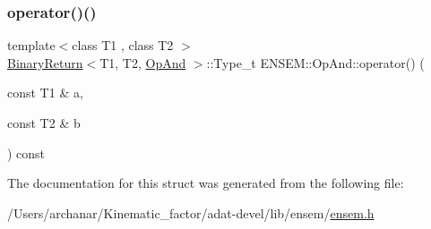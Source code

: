 \subsubsection{\texorpdfstring{operator()()}{operator()()}\hspace{0.1cm}{\footnotesize\ttfamily [3/3]}}
{\footnotesize\ttfamily template$<$class T1 , class T2 $>$ \\
\mbox{\hyperlink{structENSEM_1_1BinaryReturn}{Binary\+Return}}$<$T1, T2, \mbox{\hyperlink{structENSEM_1_1OpAnd}{Op\+And}} $>$\+::Type\+\_\+t E\+N\+S\+E\+M\+::\+Op\+And\+::operator() (\begin{DoxyParamCaption}\item[{const T1 \&}]{a,  }\item[{const T2 \&}]{b }\end{DoxyParamCaption}) const\hspace{0.3cm}{\ttfamily [inline]}}



The documentation for this struct was generated from the following file\+:\begin{DoxyCompactItemize}
\item 
/\+Users/archanar/\+Kinematic\+\_\+factor/adat-\/devel/lib/ensem/\mbox{\hyperlink{adat-devel_2lib_2ensem_2ensem_8h}{ensem.\+h}}\end{DoxyCompactItemize}
